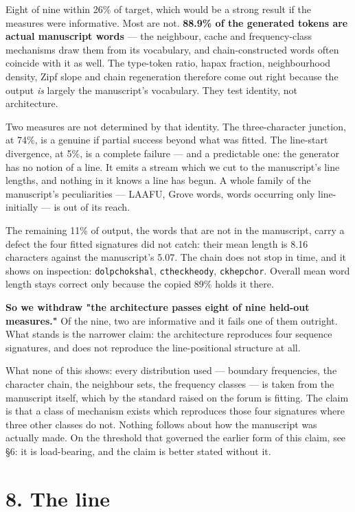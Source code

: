 \documentclass[11pt,a4paper]{article}
\begin{document}
Eight of nine within 26\% of target, which would be a strong result if the measures were informative. Most are not. \textbf{88.9\% of the generated tokens are actual manuscript words} --- the neighbour, cache and frequency-class mechanisms draw them from its vocabulary, and chain-constructed words often coincide with it as well. The type-token ratio, hapax fraction, neighbourhood density, Zipf slope and chain regeneration therefore come out right because the output \emph{is} largely the manuscript's vocabulary. They test identity, not architecture.


Two measures are not determined by that identity. The three-character junction, at 74\%, is a genuine if partial success beyond what was fitted. The line-start divergence, at 5\%, is a complete failure --- and a predictable one: the generator has no notion of a line. It emits a stream which we cut to the manuscript's line lengths, and nothing in it knows a line has begun. A whole family of the manuscript's peculiarities --- LAAFU, Grove words, words occurring only line-initially --- is out of its reach.


The remaining 11\% of output, the words that are not in the manuscript, carry a defect the four fitted signatures did not catch: their mean length is 8.16 characters against the manuscript's 5.07. The chain does not stop in time, and it shows on inspection: \texttt{dolpchokshal}, \texttt{ctheckheody}, \texttt{ckhepchor}. Overall mean word length stays correct only because the copied 89\% holds it there.


\textbf{So we withdraw "the architecture passes eight of nine held-out measures."} Of the nine, two are informative and it fails one of them outright. What stands is the narrower claim: the architecture reproduces four sequence signatures, and does not reproduce the line-positional structure at all.


What none of this shows: every distribution used --- boundary frequencies, the character chain, the neighbour sets, the frequency classes --- is taken from the manuscript itself, which by the standard raised on the forum is fitting. The claim is that a class of mechanism exists which reproduces those four signatures where three other classes do not. Nothing follows about how the manuscript was actually made. On the threshold that governed the earlier form of this claim, see \S6: it is load-bearing, and the claim is better stated without it.


\section*{8. The line}
\end{document}
